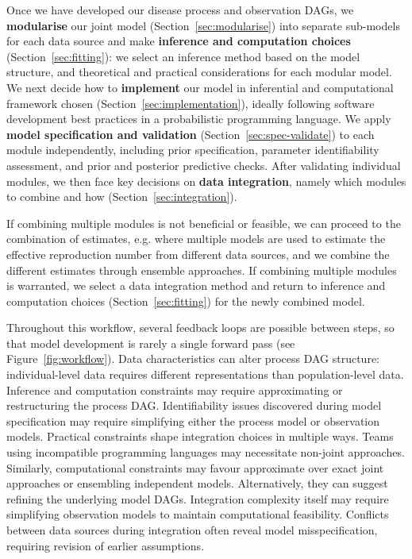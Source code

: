 \documentclass{article}
\begin{document}
Once we have developed our disease process and observation DAGs, we \textbf{modularise} our joint model (Section~\ref{sec:modularise}) into separate sub-models for each data source and make \textbf{inference and computation choices} (Section~\ref{sec:fitting}): we select an inference method based on the model structure, and theoretical and practical considerations for each modular model.
We next decide how to \textbf{implement} our model in inferential and computational framework chosen (Section~\ref{sec:implementation}), ideally following software development best practices in a probabilistic programming language.
We apply \textbf{model specification and validation} (Section~\ref{sec:spec-validate}) to each module independently, including prior specification, parameter identifiability assessment, and prior and posterior predictive checks.
After validating individual modules, we then face key decisions on \textbf{data integration}, namely which modules to combine and how  (Section~\ref{sec:integration}).

If combining multiple modules is not beneficial or feasible, we can proceed to the combination of estimates, e.g. where multiple models are used to estimate the effective reproduction number from different data sources, and we combine the different estimates through ensemble approaches. If combining multiple modules is warranted, we select a data integration method and return to inference and computation choices (Section~\ref{sec:fitting}) for the newly combined model.

Throughout this workflow, several feedback loops are possible between steps, so that model development is rarely a single forward pass (see Figure~\ref{fig:workflow}). 
Data characteristics can alter process DAG structure: individual-level data requires different representations than population-level data. 
Inference and computation constraints may require approximating or restructuring the process DAG.
Identifiability issues discovered during model specification may require simplifying either the process model or observation models. 
Practical constraints shape integration choices in multiple ways. 
Teams using incompatible programming languages may necessitate non-joint approaches. 
Similarly, computational constraints may favour approximate over exact joint approaches or ensembling independent models.
Alternatively, they can suggest refining the underlying model DAGs.
Integration complexity itself may require simplifying observation models to maintain computational feasibility. 
Conflicts between data sources during integration often reveal model misspecification, requiring revision of earlier assumptions.
\end{document}
